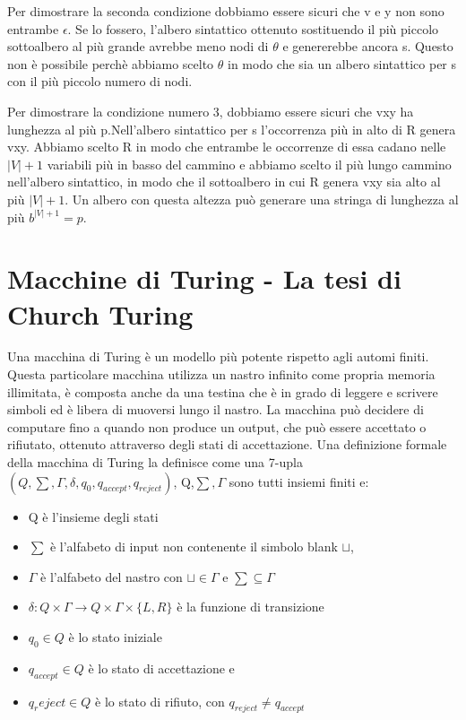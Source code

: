 \documentclass[a4paper]{extarticle}
\begin{document}
Per dimostrare la seconda condizione dobbiamo essere sicuri che v e y non sono entrambe $\epsilon$. Se lo fossero, l'albero sintattico ottenuto sostituendo il più piccolo sottoalbero al più grande avrebbe meno nodi di $\theta$ e  genererebbe ancora s. Questo non è possibile perchè abbiamo scelto $\theta$ in modo che sia un albero sintattico per s con il più piccolo numero di nodi.

Per dimostrare  la condizione numero 3, dobbiamo essere sicuri che vxy ha lunghezza al più p.Nell'albero sintattico per s l'occorrenza più in alto di R genera vxy. Abbiamo scelto R in modo che entrambe le occorrenze di essa cadano nelle $|V|+1$ variabili più in basso del cammino e abbiamo scelto il più lungo cammino nell'albero sintattico, in modo che il sottoalbero in cui R genera vxy sia alto al più $|V|+1$. Un albero con questa altezza può generare una stringa di lunghezza al più $b^{|V|+1}=p$.
\newpage
\section{Macchine di Turing - La tesi di Church Turing}

Una macchina di Turing è un modello più potente rispetto agli automi finiti. Questa particolare macchina utilizza un nastro infinito come propria memoria illimitata, è composta anche da una testina che è in grado di leggere e scrivere simboli ed è libera di muoversi lungo il nastro. La macchina può decidere di computare fino a quando non produce un output, che può essere accettato o rifiutato, ottenuto attraverso degli stati di accettazione. Una definizione formale della macchina di Turing la definisce come una 7-upla $(Q,\sum,\Gamma,\delta,q_0,q_{accept},q_{reject})$, Q,$\sum,\Gamma$ sono tutti insiemi finiti e:
\begin{itemize}
\item Q è l'insieme degli stati 
\item $\sum$ è l'alfabeto di input non contenente il simbolo blank $\sqcup$,
\item $\Gamma$ è l'alfabeto del nastro con $\sqcup \in \Gamma$ e $\sum \subseteq \Gamma$
\item $\delta :  Q \times \Gamma \longrightarrow Q \times \Gamma \times \{L,R\}$ è la funzione di transizione
\item $q_0 \in Q$ è lo stato iniziale
\item $q_{accept} \in Q$ è lo stato di accettazione e
\item $q_reject \in Q$ è lo stato di rifiuto, con $q_{reject}\ne q_{accept}$
\end{itemize}
\end{document}
